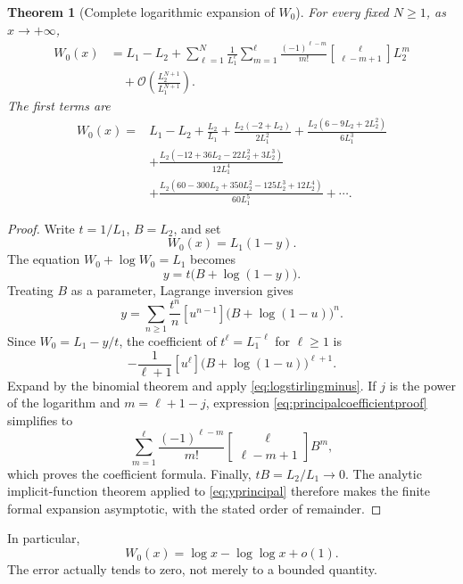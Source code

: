 \documentclass[11pt,oneside]{book}
\newtheorem{theorem}{Theorem}[chapter]
\theoremstyle{definition}
\theoremstyle{remark}
\newcommand{\bigO}{\mathcal O}
\newcommand{\stirlingone}[2]{\genfrac{[}{]}{0pt}{}{#1}{#2}}
\begin{document}
\begin{theorem}[Complete logarithmic expansion of $W_0$]\label{thm:w0asymptotic}
For every fixed $N\ge1$, as $x\to+\infty$,
\begin{align}
 W_0(x)
 &=L_1-L_2
 +\sum_{\ell=1}^{N}\frac1{L_1^\ell}
   \sum_{m=1}^{\ell}
   \frac{(-1)^{\ell-m}}{m!}
   \stirlingone{\ell}{\ell-m+1}L_2^m
 \nonumber\\
 &\quad+\bigO\!\left(\frac{L_2^{N+1}}{L_1^{N+1}}\right).
 \label{eq:w0asymptoticgeneral}
\end{align}
The first terms are
\begin{align}
 W_0(x)={}&L_1-L_2+\frac{L_2}{L_1}
 +\frac{L_2(-2+L_2)}{2L_1^2}
 +\frac{L_2(6-9L_2+2L_2^2)}{6L_1^3}\nonumber\\
 &+\frac{L_2(-12+36L_2-22L_2^2+3L_2^3)}{12L_1^4}\nonumber\\
 &+\frac{L_2(60-300L_2+350L_2^2-125L_2^3+12L_2^4)}{60L_1^5}
 +\cdots.
 \label{eq:w0asymptoticexplicit}
\end{align}
\end{theorem}

\begin{proof}
Write $t=1/L_1$, $B=L_2$, and set
\[
 W_0(x)=L_1(1-y).
\]
The equation $W_0+\log W_0=L_1$ becomes
\begin{equation}\label{eq:yprincipal}
 y=t\bigl(B+\log(1-y)\bigr).
\end{equation}
Treating $B$ as a parameter, Lagrange inversion gives
\[
 y=\sum_{n\ge1}\frac{t^n}{n}
 [u^{n-1}]\bigl(B+\log(1-u)\bigr)^n.
\]
Since $W_0=L_1-y/t$, the coefficient of $t^\ell=L_1^{-\ell}$
for $\ell\ge1$ is
\begin{equation}\label{eq:principalcoefficientproof}
 -\frac1{\ell+1}[u^\ell]
 \bigl(B+\log(1-u)\bigr)^{\ell+1}.
\end{equation}
Expand by the binomial theorem and apply
\eqref{eq:logstirlingminus}.  If $j$ is the power of the logarithm and
$m=\ell+1-j$, expression \eqref{eq:principalcoefficientproof} simplifies to
\[
 \sum_{m=1}^{\ell}
 \frac{(-1)^{\ell-m}}{m!}
 \stirlingone{\ell}{\ell-m+1}B^m,
\]
which proves the coefficient formula.  Finally, $tB=L_2/L_1\to0$.
The analytic implicit-function theorem applied to \eqref{eq:yprincipal}
therefore makes the finite formal expansion asymptotic, with the stated order
of remainder.
\end{proof}

In particular,
\begin{equation}\label{eq:w0twoterm}
 W_0(x)=\log x-\log\log x+o(1).
\end{equation}
The error actually tends to zero, not merely to a bounded quantity.
\end{document}
